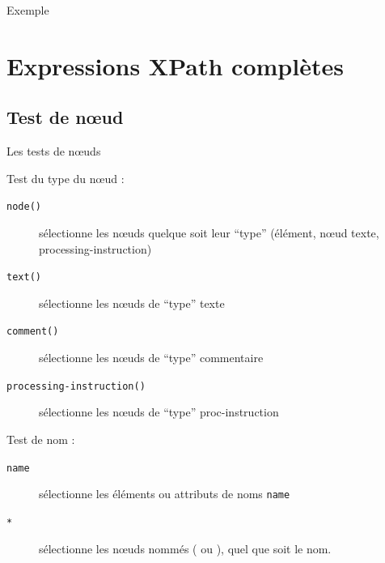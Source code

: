 \begin{frame}[allowframebreaks]{Exemple}
\begin{center}
\end{center}

\end{frame}

\section{Expressions XPath complètes}


\subsection{Test de n{\oe}ud}

\begin{frame}{Les tests de n{\oe}uds}

Test du type du n{\oe}ud :
\begin{description}
\item[\verb?node()?] sélectionne les nœuds quelque soit leur ``type'' (élément, n{\oe}ud texte, processing-instruction)
\item[\verb?text()?] sélectionne les n{\oe}uds de ``type'' texte
\item[\verb?comment()?] sélectionne les nœuds de ``type'' commentaire
\item[\verb?processing-instruction()?] sélectionne les nœuds de ``type'' proc-instruction
\end{description}

\medskip

Test de nom :
\begin{description}
\item[\verb?name?] sélectionne les éléments ou attributs de noms \texttt{name}
\item[\verb?*?] sélectionne les n{\oe}uds \alert{nommés} ( ou ), quel que soit le nom.
\end{description}

\end{frame}

